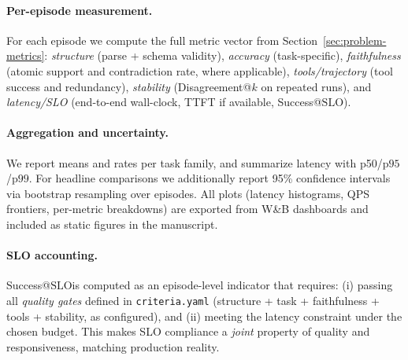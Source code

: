 \documentclass[11pt]{article}
\newcommand{\pninetyfive}{\ensuremath{\mathrm{p95}}}
\newcommand{\pninetynine}{\ensuremath{\mathrm{p99}}}
\newcommand{\slo}{\ensuremath{\mathrm{SLO}}}
\begin{document}
\paragraph{Per-episode measurement.}
For each episode we compute the full metric vector from Section~\ref{sec:problem-metrics}:
\emph{structure} (parse + schema validity),
\emph{accuracy} (task-specific),
\emph{faithfulness} (atomic support and contradiction rate, where applicable),
\emph{tools/trajectory} (tool success and redundancy),
\emph{stability} (Disagreement@$k$ on repeated runs),
and \emph{latency/SLO} (end-to-end wall-clock, TTFT if available, Success@\slo).

\paragraph{Aggregation and uncertainty.}
We report means and rates per task family, and summarize latency with p50/\pninetyfive/\pninetynine.
For headline comparisons we additionally report 95\% confidence intervals via bootstrap resampling over episodes.
All plots (latency histograms, QPS frontiers, per-metric breakdowns) are exported from W\&B dashboards and included as static figures in the manuscript.

\paragraph{SLO accounting.}
Success@\slo is computed as an episode-level indicator that requires:
(i) passing all \emph{quality gates} defined in \texttt{criteria.yaml} (structure + task + faithfulness + tools + stability, as configured), and
(ii) meeting the latency constraint under the chosen budget.
This makes SLO compliance a \emph{joint} property of quality and responsiveness, matching production reality.
\end{document}
